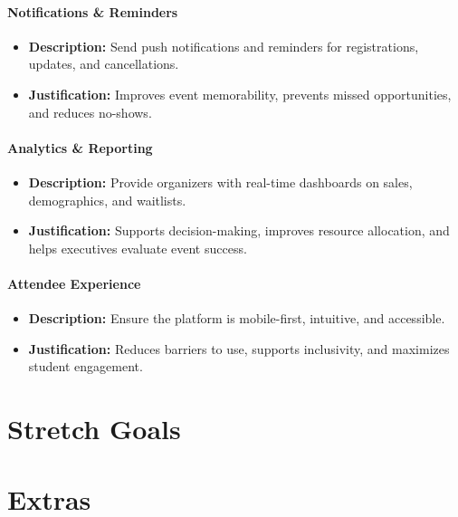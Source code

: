 \documentclass{article}
\begin{document}
\paragraph{Notifications \& Reminders}
\begin{itemize}
    \item \textbf{Description:} Send push notifications and reminders for registrations, updates, and cancellations.
    \item \textbf{Justification:} Improves event memorability, prevents missed opportunities, and reduces no-shows.
\end{itemize}

\paragraph{Analytics \& Reporting}
\begin{itemize}
    \item \textbf{Description:} Provide organizers with real-time dashboards on sales, demographics, and waitlists.
    \item \textbf{Justification:} Supports decision-making, improves resource allocation, and helps executives evaluate event success.
\end{itemize}

\paragraph{Attendee Experience}
\begin{itemize}
    \item \textbf{Description:} Ensure the platform is mobile-first, intuitive, and accessible.
    \item \textbf{Justification:} Reduces barriers to use, supports inclusivity, and maximizes student engagement.
\end{itemize}

\section{Stretch Goals}

\section{Extras}

\end{document}

